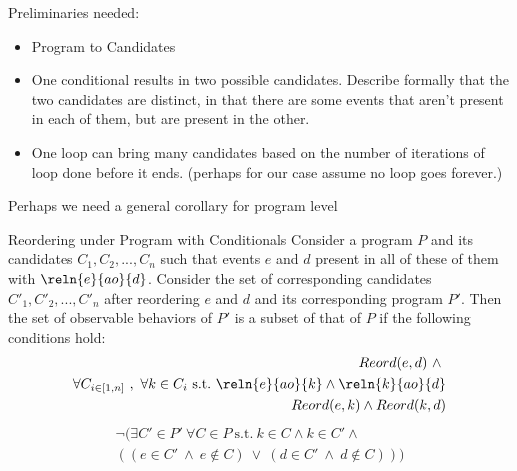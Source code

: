     
    Preliminaries needed:
    \begin{itemize}
        \item Program to Candidates 
        \item One conditional results in two possible candidates. Describe formally that the two candidates are distinct, in that there are some events that aren't present in each of them, but are present in the other. 
        \item One loop can bring many candidates based on the number of iterations of loop done before it ends. (perhaps for our case assume no loop goes forever.)
    \end{itemize}

    Perhaps we need a general corollary for program level 
    \begin{corollary}{Reordering under Program with Conditionals}
        Consider a program $P$ and its candidates $C_1, C_2, ... , C_n$ such that events $e$ and $d$ present in all of these of them with $\reln{e}{ao}{d}$. Consider the set of corresponding candidates $C'_1, C'_2, ... , C'_n$ after reordering $e$ and $d$ and its corresponding program $P'$. Then the set of observable behaviors of $P'$ is a subset of that of $P$ if the following conditions hold:
        \begin{align*}
            Reord(e,d) \ \wedge \ \\ 
            \forall C_{i \in [1,n]} \ , \ \forall k \in C_i \ \text{s.t.} \ \reln{e}{ao}{k} \wedge \reln{k}{ao}{d} \\ 
            Reord(e,k) \wedge Reord(k,d) 
        \end{align*}
        \begin{align*}
            \neg (
                \exists C' \in P' \ \forall C \in P \ \text{s.t.} \ k \in C \wedge k \in C' \wedge \\ 
                (
                    (e \in C' \ \wedge \ e \notin C) \ \vee \ (d \in C' \ \wedge \ d \notin C)
                )
            ) 
            \end{align*}
    \end{corollary}

